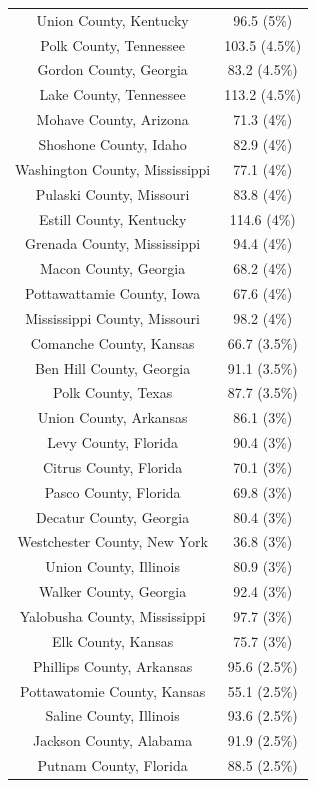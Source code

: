 \begin{table}[ht]
\begin{tabular}{cc}
  Union County, Kentucky & 96.5 (5\%) \\ 
  Polk County, Tennessee & 103.5 (4.5\%) \\ 
  Gordon County, Georgia & 83.2 (4.5\%) \\ 
  Lake County, Tennessee & 113.2 (4.5\%) \\ 
  Mohave County, Arizona & 71.3 (4\%) \\ 
  Shoshone County, Idaho & 82.9 (4\%) \\ 
  Washington County, Mississippi & 77.1 (4\%) \\ 
  Pulaski County, Missouri & 83.8 (4\%) \\ 
  Estill County, Kentucky & 114.6 (4\%) \\ 
  Grenada County, Mississippi & 94.4 (4\%) \\ 
  Macon County, Georgia & 68.2 (4\%) \\ 
  Pottawattamie County, Iowa & 67.6 (4\%) \\ 
  Mississippi County, Missouri & 98.2 (4\%) \\ 
  Comanche County, Kansas & 66.7 (3.5\%) \\ 
  Ben Hill County, Georgia & 91.1 (3.5\%) \\ 
  Polk County, Texas & 87.7 (3.5\%) \\ 
  Union County, Arkansas & 86.1 (3\%) \\ 
  Levy County, Florida & 90.4 (3\%) \\ 
  Citrus County, Florida & 70.1 (3\%) \\ 
  Pasco County, Florida & 69.8 (3\%) \\ 
  Decatur County, Georgia & 80.4 (3\%) \\ 
  Westchester County, New York & 36.8 (3\%) \\ 
  Union County, Illinois & 80.9 (3\%) \\ 
  Walker County, Georgia & 92.4 (3\%) \\ 
  Yalobusha County, Mississippi & 97.7 (3\%) \\ 
  Elk County, Kansas & 75.7 (3\%) \\ 
  Phillips County, Arkansas & 95.6 (2.5\%) \\ 
  Pottawatomie County, Kansas & 55.1 (2.5\%) \\ 
  Saline County, Illinois & 93.6 (2.5\%) \\ 
  Jackson County, Alabama & 91.9 (2.5\%) \\ 
  Putnam County, Florida & 88.5 (2.5\%) \\ 

\end{tabular}
\end{table}
